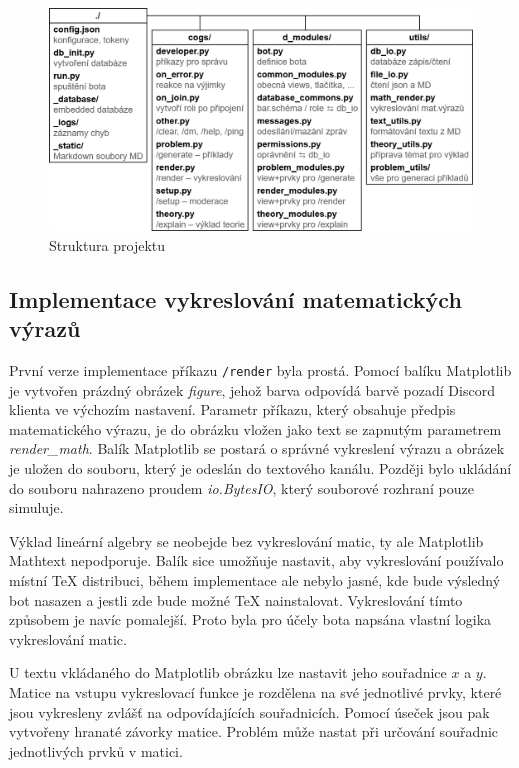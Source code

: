 \documentclass[FM]{tulthesis}
\begin{document}
	\begin{figure}[ht]
		\centering
		\includegraphics[width=\textwidth]{img/ProjectStructure}
		\caption{Struktura projektu}
	\end{figure}

	\subsection{Implementace vykreslování matematických výrazů}\label{_tag_section_approxtexlen}

	První verze implementace příkazu \verb|/render| byla prostá. Pomocí balíku Matplotlib je vytvořen prázdný obrázek \textit{figure}, jehož barva odpovídá barvě pozadí Discord klienta ve výchozím nastavení. Parametr příkazu, který obsahuje předpis matematického výrazu, je do obrázku vložen jako text se zapnutým parametrem \textit{render\_math}. Balík Matplotlib se postará o správné vykreslení výrazu a obrázek je uložen do souboru, který je odeslán do textového kanálu. Později bylo ukládání do souboru nahrazeno proudem \textit{io.BytesIO}, který souborové rozhraní pouze simuluje.

	Výklad lineární algebry se neobejde bez vykreslování matic, ty ale Matplotlib Mathtext nepodporuje. Balík sice umožňuje nastavit, aby vykreslování používalo místní TeX distribuci, během implementace ale nebylo jasné, kde bude výsledný bot nasazen a jestli zde bude možné TeX nainstalovat. Vykreslování tímto způsobem je navíc pomalejší. Proto byla pro účely bota napsána vlastní logika vykreslování matic.
	
	U textu vkládaného do Matplotlib obrázku lze nastavit jeho souřadnice $x$ a $y$. Matice na vstupu vykreslovací funkce je rozdělena na své jednotlivé prvky, které jsou vykresleny zvlášť na odpovídajících souřadnicích. Pomocí úseček jsou pak vytvořeny hranaté závorky matice. Problém může nastat při určování souřadnic jednotlivých prvků v matici.
	
\end{document}
